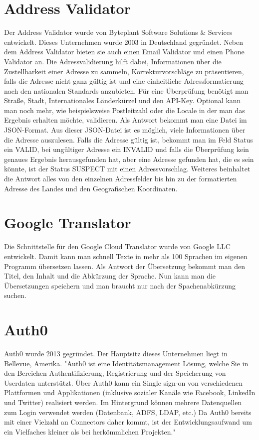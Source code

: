\section{Address Validator}
Der Address Validator wurde von Byteplant Software Solutions \& Services entwickelt. Dieses Unternehmen wurde 2003 in Deutschland gegründet. Neben dem Address Validator bieten sie auch einen Email Validator und einen Phone Validator an. Die Adressvalidierung hilft dabei, Informationen über die Zustellbarkeit einer Adresse zu sammeln, Korrekturvorschläge zu präsentieren, falls die Adresse nicht ganz gültig ist und eine einheitliche Adressformatierung nach den nationalen Standards anzubieten. Für eine Überprüfung benötigt man Straße, Stadt, Internationales Länderkürzel und den API-Key. Optional kann man noch mehr, wie beispielsweise Postleitzahl oder die Locale in der man das Ergebnis erhalten möchte, validieren. Als Antwort bekommt man eine Datei im JSON-Format. Aus dieser JSON-Datei ist es möglich, viele Informationen über die Adresse auszulesen. Falls die Adresse gültig ist, bekommt man im Feld Status ein VALID, bei ungültiger Adresse ein INVALID und falls die Überprüfung kein genaues Ergebnis herausgefunden hat, aber eine Adresse gefunden hat, die es sein könnte, ist der Status SUSPECT mit einen Adressvorschlag. Weiteres beinhaltet die Antwort alles von den einzelnen Adressfelder bis hin zu der formatierten Adresse des Landes und den Geografischen Koordinaten. \cite{addressValidator}

\section{Google Translator}
Die Schnittstelle für den Google Cloud Translator wurde von Google LLC entwickelt. Damit kann man schnell Texte in mehr als 100 Sprachen im eigenen Programm übersetzen lassen. Als Antwort der Übersetzung bekommt man den Titel, den Inhalt und die Abkürzung der Sprache. Nun kann man die Übersetzungen speichern und man braucht nur nach der Spachenabkürzung suchen.
\cite{googleTranslator}

\section{Auth0}
Auth0 wurde 2013 gegründet. Der Hauptsitz dieses Unternehmen liegt in Bellevue, Amerika. "Auth0 ist eine Identitätsmanagement Lösung, welche Sie in den Bereichen Authentifizierung, Registrierung und der Speicherung von Userdaten unterstützt. Über Auth0 kann ein Single sign-on von verschiedenen Plattformen und Applikationen (inklusive sozialer Kanäle wie Facebook, LinkedIn und Twitter) realisiert werden. Im Hintergrund können mehrere Datenquellen zum Login verwendet werden (Datenbank, ADFS, LDAP, etc.) Da Auth0 bereits mit einer Vielzahl an Connectors daher kommt, ist der Entwicklungsaufwand um ein Vielfaches kleiner als bei herkömmlichen Projekten." \autocite{auth0}

